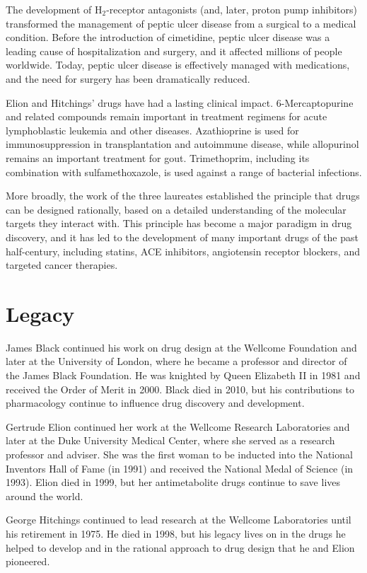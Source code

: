 The development of H$_2$-receptor antagonists (and, later, proton pump inhibitors) transformed the management of peptic ulcer disease from a surgical to a medical condition. Before the introduction of cimetidine, peptic ulcer disease was a leading cause of hospitalization and surgery, and it affected millions of people worldwide. Today, peptic ulcer disease is effectively managed with medications, and the need for surgery has been dramatically reduced.

Elion and Hitchings' drugs have had a lasting clinical impact. 6-Mercaptopurine and related compounds remain important in treatment regimens for acute lymphoblastic leukemia and other diseases. Azathioprine is used for immunosuppression in transplantation and autoimmune disease, while allopurinol remains an important treatment for gout. Trimethoprim, including its combination with sulfamethoxazole, is used against a range of bacterial infections.

More broadly, the work of the three laureates established the principle that drugs can be designed rationally, based on a detailed understanding of the molecular targets they interact with. This principle has become a major paradigm in drug discovery, and it has led to the development of many important drugs of the past half-century, including statins, ACE inhibitors, angiotensin receptor blockers, and targeted cancer therapies.

\section{Legacy}

James Black continued his work on drug design at the Wellcome Foundation and later at the University of London, where he became a professor and director of the James Black Foundation. He was knighted by Queen Elizabeth II in 1981 and received the Order of Merit in 2000. Black died in 2010, but his contributions to pharmacology continue to influence drug discovery and development.

Gertrude Elion continued her work at the Wellcome Research Laboratories and later at the Duke University Medical Center, where she served as a research professor and adviser. She was the first woman to be inducted into the National Inventors Hall of Fame (in 1991) and received the National Medal of Science (in 1993). Elion died in 1999, but her antimetabolite drugs continue to save lives around the world.

George Hitchings continued to lead research at the Wellcome Laboratories until his retirement in 1975. He died in 1998, but his legacy lives on in the drugs he helped to develop and in the rational approach to drug design that he and Elion pioneered.

